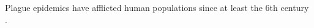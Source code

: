 \documentclass[12pt]{article}
\begin{document}
Plague epidemics have afflicted human populations since at least the 6th century \cite{McNe76,Wagn+14}. 



\end{document}
